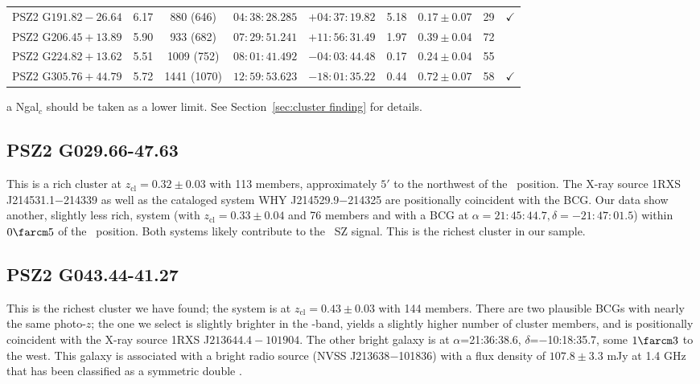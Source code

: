 \documentclass[apj, revtex4-1]{emulateapj}
\begin{document}
\begin{table}
\begin{threeparttable}
\begin{tabular}{lcccccccc}
	 PSZ2 G$191.82-26.64$ & 6.17 & 880 (646) & $04:38:28.285$ &  $+04:37:19.82$ & 5.18 & $0.17 \pm 0.07$ & 29 & $\checkmark$ \\
	 PSZ2 G$206.45+13.89$ & 5.90 & 933 (682) & $07:29:51.241$ &  $+11:56:31.49$ & 1.97 & $0.39 \pm 0.04$ & 72\tnote{a} & \\
	 PSZ2 G$224.82+13.62$ & 5.51 & 1009 (752) & $08:01:41.492$ &  $-04:03:44.48$ & 0.17 & $0.24 \pm 0.04$ & 55 & \\
	 PSZ2 G$305.76+44.79$ & 5.72 & 1441 (1070) & $12:59:53.623$ &  $-18:01:35.22$ & 0.44 & $0.72 \pm 0.07$ & 58\tnote{a} & $\checkmark$ \\
	\hline
	\end{tabular}
	\begin{tablenotes}
		\item[a] Ngal$_c$ should be taken as a lower limit. See Section~\ref{sec:cluster finding} for details.
	\end{tablenotes}
	\end{threeparttable}

\label{tbl:results}
\end{table}

\subsection{PSZ2 G029.66-47.63} %
This is a rich cluster at $z_\mathrm{cl} = 0.32 \pm 0.03$ with 113 members, approximately $5'$ to the northwest of the \planck\ position. The X-ray source 1RXS J214531.1$-$214339 as well as the cataloged system WHY J214529.9$-$214325 are positionally coincident with the BCG. Our data show another, slightly less rich, system (with $z_\mathrm{cl} = 0.33 \pm 0.04$ and 76 members and with a BCG at $\alpha=21:45:44.7, \delta=-21:47:01.5$) within $0\farcm5$ of the \planck\ position. Both systems likely contribute to the \planck\ SZ signal. This is the richest cluster in our sample.

\subsection{PSZ2 G043.44-41.27} %
This is the richest cluster we have found; the system is at $z_\mathrm{cl} = 0.43 \pm 0.03$ with 144 members. There are two plausible BCGs with nearly the same photo-$z$; the one we select is slightly brighter in the \sdssi-band, yields a slightly higher number of cluster members, and is positionally coincident with the X-ray source 1RXS J$213644.4-101904$. The other bright galaxy is at $\alpha$=21:36:38.6, $\delta$=$-$10:18:35.7, some $1\farcm3$ to the west. This galaxy is associated with a bright radio source (NVSS J213638$-$101836) with a flux density of $107.8 \pm 3.3$ mJy at 1.4 GHz that has been classified as a symmetric double \citep{Douglas1996}.
\end{document}
